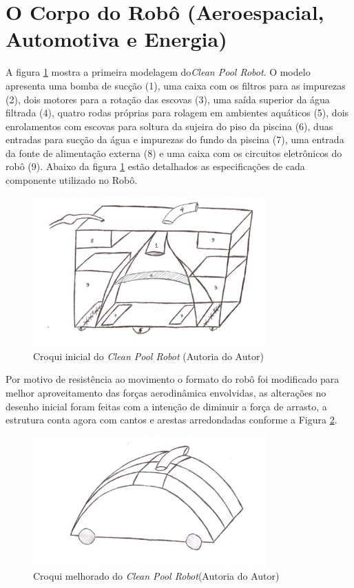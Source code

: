 \section{O Corpo do Robô (Aeroespacial, Automotiva e Energia)}
A figura \ref{fig:initial_croqui} mostra a primeira modelagem do\textit{Clean Pool Robot}. O modelo
apresenta uma bomba de sucção (1), uma caixa com os filtros para as impurezas
(2), dois motores para a rotação das escovas (3), uma saída superior da água
filtrada (4), quatro rodas próprias para rolagem em ambientes aquáticos (5),
dois enrolamentos com escovas para soltura da sujeira do piso da piscina (6),
duas entradas para sucção da água e impurezas do fundo da piscina (7), uma
entrada da fonte de alimentação externa (8) e uma caixa com os circuitos
eletrônicos do robô (9). Abaixo da figura \ref{fig:initial_croqui} estão detalhados as especificações
de cada componente utilizado no Robô.
\par
\begin{figure}[h]
  \centering
  \includegraphics[width=0.8\textwidth]{figures/croqui.png}
  \caption{ Croqui inicial do \textit{Clean Pool Robot} (\textsf{Autoria do Autor})}
  \label{fig:initial_croqui}
\end{figure}
\FloatBarrier
\par
Por motivo de resistência ao movimento o formato do robô foi modificado para
melhor aproveitamento das forças aerodinâmica envolvidas, as alterações no
desenho inicial foram feitas com a intenção de diminuir a força de arrasto, a
estrutura conta agora com cantos e arestas arredondadas conforme a Figura \ref{fig:better-croqui}.
\par
\begin{figure}[h]
  \centering
  \includegraphics[width=0.8\textwidth]{figures/better-croqui.png}
  \caption{ Croqui melhorado do \textit{Clean Pool Robot}(\textsf{Autoria do Autor})}
  \label{fig:better-croqui}
\end{figure}
